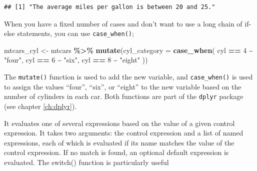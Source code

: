 \documentclass[
  12pt,
  oneside]{book}
\newenvironment{Shaded}{\begin{snugshade}}{\end{snugshade}}
\newcommand{\AttributeTok}[1]{\textcolor[rgb]{0.13,0.29,0.53}{#1}}
\newcommand{\CommentTok}[1]{\textcolor[rgb]{0.56,0.35,0.01}{\textit{#1}}}
\newcommand{\DecValTok}[1]{\textcolor[rgb]{0.00,0.00,0.81}{#1}}
\newcommand{\FunctionTok}[1]{\textcolor[rgb]{0.13,0.29,0.53}{\textbf{#1}}}
\newcommand{\NormalTok}[1]{#1}
\newcommand{\OtherTok}[1]{\textcolor[rgb]{0.56,0.35,0.01}{#1}}
\newcommand{\SpecialCharTok}[1]{\textcolor[rgb]{0.81,0.36,0.00}{\textbf{#1}}}
\newcommand{\StringTok}[1]{\textcolor[rgb]{0.31,0.60,0.02}{#1}}
\begin{document}
\begin{verbatim}
## [1] "The average miles per gallon is between 20 and 25."
\end{verbatim}

\begin{Shaded}
\end{Shaded}

When you have a fixed number of cases and don't want to use a long chain of if-else statements, you can use \texttt{case\_when()};

\begin{Shaded}
\begin{Highlighting}[]
\NormalTok{mtcars\_cyl }\OtherTok{\textless{}{-}}\NormalTok{ mtcars }\SpecialCharTok{\%\textgreater{}\%}
  \FunctionTok{mutate}\NormalTok{(}\AttributeTok{cyl\_category =} \FunctionTok{case\_when}\NormalTok{(}
\NormalTok{    cyl }\SpecialCharTok{==} \DecValTok{4} \SpecialCharTok{\textasciitilde{}} \StringTok{"four"}\NormalTok{,}
\NormalTok{    cyl }\SpecialCharTok{==} \DecValTok{6} \SpecialCharTok{\textasciitilde{}} \StringTok{"six"}\NormalTok{,}
\NormalTok{    cyl }\SpecialCharTok{==} \DecValTok{8} \SpecialCharTok{\textasciitilde{}} \StringTok{"eight"}
\NormalTok{  ))}
\end{Highlighting}
\end{Shaded}

The \texttt{mutate()} function is used to add the new variable, and \texttt{case\_when()} is used to assign the values ``four'', ``six'', or ``eight'' to the new variable based on the number of cylinders in each car. Both functions are part of the \texttt{dplyr} package (see chapter \ref{ch:dplyr}).

It evaluates one of several expressions based on the value of a given control expression. It takes two arguments: the control expression and a list of named expressions, each of which is evaluated if its name matches the value of the control expression. If no match is found, an optional default expression is evaluated. The switch() function is particularly useful
\end{document}
